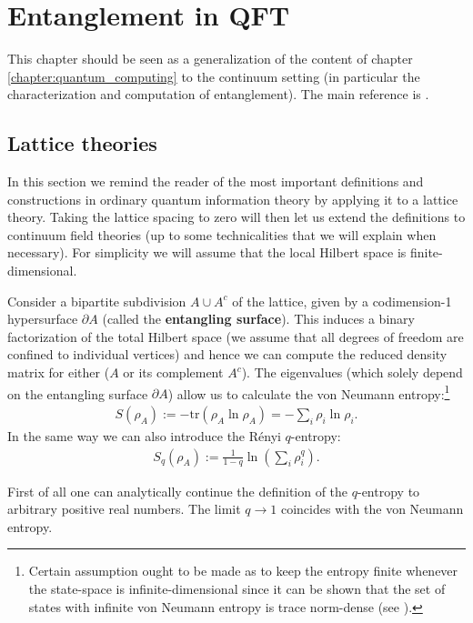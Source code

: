 \chapter{Entanglement in QFT}

    This chapter should be seen as a generalization of the content of chapter \ref{chapter:quantum_computing} to the continuum setting (in particular the characterization and computation of entanglement). The main reference is \cite{entanglement_entropy, tuybens}.

\section{Lattice theories}

    In this section we remind the reader of the most important definitions and constructions in ordinary quantum information theory by applying it to a lattice theory. Taking the lattice spacing to zero will then let us extend the definitions to continuum field theories (up to some technicalities that we will explain when necessary). For simplicity we will assume that the local Hilbert space is finite-dimensional.

    Consider a bipartite subdivision $A\cup A^c$ of the lattice, given by a codimension-1 hypersurface $\partial A$ (called the \textbf{entangling surface}). This induces a binary factorization of the total Hilbert space (we assume that all degrees of freedom are confined to individual vertices) and hence we can compute the reduced density matrix for either ($A$ or its complement $A^c$). The eigenvalues (which solely depend on the entangling surface $\partial A$) allow us to calculate the von Neumann entropy:\footnote{Certain assumption ought to be made as to keep the entropy finite whenever the state-space is infinite-dimensional since it can be shown that the set of states with infinite von Neumann entropy is trace norm-dense (see \cite{Eisert_entropy}).}
    \begin{gather}
        S(\rho_A) := -\text{tr}(\rho_A\ln\rho_A) = -\sum_i\rho_i\ln\rho_i.
    \end{gather}
    In the same way we can also introduce the R\'enyi $q$-entropy:
    \begin{gather}
        S_q(\rho_A) := \frac{1}{1-q}\ln\left(\sum_i\rho_i^q\right).
    \end{gather}
    \begin{property}
     First of all one can analytically continue the definition of the $q$-entropy to arbitrary positive real numbers. The limit $q\rightarrow1$ coincides with the von Neumann entropy.
    \end{property}

